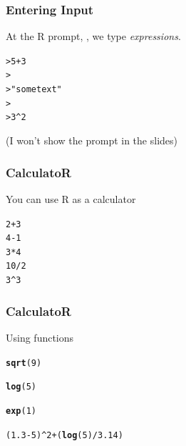 \documentclass[12pt]{beamer}\usepackage[]{graphicx}\usepackage[]{color}
\makeatletter
\newcommand{\hlnum}[1]{\textcolor[rgb]{0.686,0.059,0.569}{#1}}%
\newcommand{\hlstr}[1]{\textcolor[rgb]{0.192,0.494,0.8}{#1}}%
\newcommand{\hlopt}[1]{\textcolor[rgb]{0,0,0}{#1}}%
\newcommand{\hlstd}[1]{\textcolor[rgb]{0.345,0.345,0.345}{#1}}%
\newcommand{\hlkwd}[1]{\textcolor[rgb]{0.737,0.353,0.396}{\textbf{#1}}}%
\newenvironment{kframe}{%
 \def\at@end@of@kframe{}%
 \ifinner\ifhmode%
  \def\at@end@of@kframe{\end{minipage}}%
  \begin{minipage}{\columnwidth}%
 \fi\fi%
 \def\FrameCommand##1{\hskip\@totalleftmargin \hskip-\fboxsep
 \colorbox{shadecolor}{##1}\hskip-\fboxsep
     \hskip-\linewidth \hskip-\@totalleftmargin \hskip\columnwidth}%
 \MakeFramed {\advance\hsize-\width
   \@totalleftmargin\z@ \linewidth\hsize
   \@setminipage}}%
 {\par\unskip\endMakeFramed%
 \at@end@of@kframe}
\newenvironment{knitrout}{}{} %
\makeatother
\begin{document}

\begin{frame}
\begin{center}
\Huge{}
\end{center}
\end{frame}


\begin{frame}[fragile]
\frametitle{Entering Input}

At the R prompt, {\hilit \code{>}}, we type \textit{expressions}. 
\begin{knitrout}\footnotesize
{}\color{fgcolor}\begin{kframe}
\begin{alltt}
> 5 + 3
>
> \hlstr{"some text"}
>
> 3^2
\end{alltt}
\end{kframe}
\end{knitrout}
\eb
(I won't show the prompt in the slides)
\end{frame}


\begin{frame}[fragile]
\frametitle{CalculatoR}
You can use R as a calculator
\begin{knitrout}\footnotesize
{}\color{fgcolor}\begin{kframe}
\begin{alltt}
\hlnum{2} \hlopt{+} \hlnum{3}
\hlnum{4} \hlopt{-} \hlnum{1}
\hlnum{3} \hlopt{*} \hlnum{4}
\hlnum{10} \hlopt{/} \hlnum{2}
\hlnum{3}\hlopt{^}\hlnum{3}
\end{alltt}
\end{kframe}
\end{knitrout}

\end{frame}


\begin{frame}[fragile]
\frametitle{CalculatoR}
Using functions
\begin{knitrout}\footnotesize
{}\color{fgcolor}\begin{kframe}
\begin{alltt}
\hlkwd{sqrt}\hlstd{(}\hlnum{9}\hlstd{)}

\hlkwd{log}\hlstd{(}\hlnum{5}\hlstd{)}

\hlkwd{exp}\hlstd{(}\hlnum{1}\hlstd{)}

\hlstd{(}\hlnum{1.3} \hlopt{-} \hlnum{5}\hlstd{)}\hlopt{^}\hlnum{2} \hlopt{+} \hlstd{(}\hlkwd{log}\hlstd{(}\hlnum{5}\hlstd{)} \hlopt{/} \hlnum{3.14}\hlstd{)}
\end{alltt}
\end{kframe}
\end{knitrout}

\end{frame}
\end{document}
